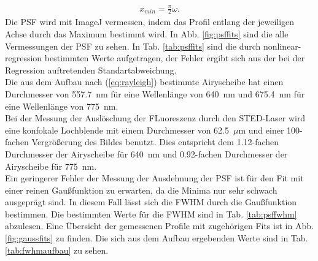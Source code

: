 \begin{align}
x_{min} = \frac{\pi}{2}\omega.
\end{align}
Die PSF wird mit ImageJ \cite{imagej} vermessen, indem das Profil entlang der jeweiligen Achse durch das Maximum bestimmt wird.
In Abb. \ref{fig:psffits} sind die alle Vermessungen der PSF zu sehen. 
In Tab. \ref{tab:psffits} sind die durch nonlinear-regression bestimmten Werte aufgetragen, der Fehler ergibt sich aus der bei der Regression auftretenden Standartabweichung.
\\
Die aus dem Aufbau nach (\ref{eq:rayleigh}) bestimmte Airyscheibe hat einen Durchmesser von 557.7~nm für eine Wellenlänge von 640~nm und 675.4~nm für eine Wellenlänge von 775~nm.
\\
Bei der Messung der Auslöschung der FLuoreszenz durch den STED-Laser wird eine konfokale Lochblende mit einem Durchmesser von 62.5~$\mu$m und einer 100-fachen Vergrößerung des Bildes benutzt. 
Dies entspricht dem 1.12-fachen Durchmesser der Airyscheibe für 640~nm und 0.92-fachen Durchmesser der Airyscheibe für 775~nm.
\\ 
Ein geringerer Fehler der Messung der Ausdehnung der PSF ist für den Fit mit einer reinen Gaußfunktion zu erwarten, da die Minima nur sehr schwach ausgeprägt sind. 
In diesem Fall lässt sich die FWHM durch die Gaußfunktion bestimmen.
Die bestimmten Werte für die FWHM sind in Tab. \ref{tab:psffwhm} abzulesen. Eine Übersicht der gemessenen Profile mit zugehörigen Fits ist in Abb. \ref{fig:gaussfits} zu finden.
Die sich aus dem Aufbau ergebenden Werte sind in Tab. \ref{tab:fwhmaufbau} zu sehen.
